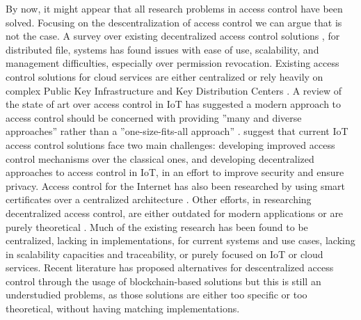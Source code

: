 By now, it might appear that all research problems in access control have been solved. Focusing on the descentralization of access control we can argue that is not the case. A survey over existing decentralized access control solutions \cite{miltchev_decentralized_2008}, for distributed file, systems has found issues with ease of use, scalability, and management difficulties, especially over permission revocation. Existing access control solutions for cloud services are either centralized \cite{calero_toward_2010, ruj_dacc:_2011, yu_achieving_2010} or rely heavily on complex Public Key Infrastructure and Key Distribution Centers \cite{ruj_privacy_2012, ruj_decentralized_2014,bauer_distributed_2005}. A review of the state of art over access control in IoT \cite{ouaddah_access_2017} has suggested a modern approach to access control should be concerned with providing ”many and diverse approaches” \cite[242]{ouaddah_access_2017} rather than a ”one-size-fits-all approach” \cite[242]{ouaddah_access_2017}. \citeauthor{ouaddah_access_2017} \cite{ouaddah_access_2017} suggest that current IoT access control solutions face two main challenges: developing improved access control mechanisms over the classical ones, and developing decentralized approaches to access control in IoT, in an effort to improve security and ensure privacy. Access control for the Internet has also been researched by using smart certificates over a centralized architecture \cite{park_smart_1999}. Other efforts, in researching decentralized access control, are either outdated for modern applications \cite{satyanarayanan_integrating_1989, karger_non-discretionary_1977} or are purely theoretical \cite{thomas_towards_1993}. Much of the existing research has been found to be centralized, lacking in implementations, for current systems and use cases, lacking in scalability capacities and traceability, or purely focused on IoT or cloud services. Recent literature has proposed alternatives for descentralized access control through the usage of blockchain-based solutions but this is still an understudied problems, as those solutions are either too specific or too theoretical, without having matching implementations.


